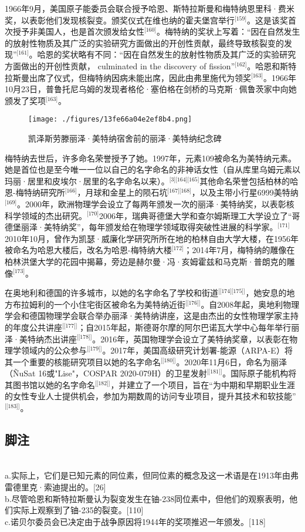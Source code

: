 1966年9月，美国原子能委员会联合授予哈恩、斯特拉斯曼和梅特纳恩里科·费米奖，以表彰他们发现核裂变。颁奖仪式在维也纳的霍夫堡宫举行\(^\text{[159]}\)。这是该奖首次授予非美国人，也是首次颁发给女性\(^\text{[160]}\)。梅特纳的奖状上写着：“因在自然发生的放射性物质及其广泛的实验研究方面做出的开创性贡献，最终导致核裂变的发现”\(^\text{[161]}\)。哈恩的奖状略有不同：“因在自然发生的放射性物质及其广泛的实验研究方面做出的开创性贡献， culminated in the discovery of fission”\(^\text{[162]}\)。哈恩和斯特拉斯曼出席了仪式，但梅特纳因病未能出席，因此由弗里施代为领奖\(^\text{[163]}\)。1966年10月23日，普鲁托尼乌姆的发现者格伦·塞伯格在剑桥的马克斯·佩鲁茨家中向她颁发了奖项\(^\text{[163]}\)。
\begin{figure}[ht]
\centering
\texttt{[image: ./figures/13fe66a04e2ef8b4.png]}
\caption{凯泽斯劳滕丽泽·美特纳宿舍前的丽泽·美特纳纪念碑} \label{fig_LZm_17}
\end{figure}
梅特纳去世后，许多命名荣誉授予了她。1997年，元素109被命名为美特纳元素。她是首位也是至今唯一一位以自己的名字命名的非神话女性（自从库里乌姆元素以玛丽·居里和皮埃尔·居里的名字命名以来）。\(^\text{[3][164][165]}\)其他命名荣誉包括柏林的哈恩-梅特纳研究所\(^\text{[166]}\)，月球和金星上的陨石坑\(^\text{[167][168]}\)，以及主带小行星6999美特纳\(^\text{[169]}\)。2000年，欧洲物理学会设立了每两年颁发一次的丽泽·美特纳奖，以表彰核科学领域的杰出研究。\(^\text{[170]}\)2006年，瑞典哥德堡大学和查尔姆斯理工大学设立了“哥德堡丽泽·美特纳奖”，每年颁发给在物理学领域取得突破性进展的科学家。\(^\text{[171]}\)2010年10月，曾作为凯瑟·威廉化学研究所所在地的柏林自由大学大楼，在1956年被命名为哈恩大楼后，改名为哈恩-梅特纳大楼\(^\text{[172]}\)；2014年7月，梅特纳的雕像在柏林洪堡大学的花园中揭幕，旁边是赫尔曼·冯·亥姆霍兹和马克斯·普朗克的雕像\(^\text{[173]}\)。

在奥地利和德国的许多城市，以她的名字命名了学校和街道\(^\text{[[174][175]]}\)，她安息的地方布拉姆利的一个小住宅街区被命名为美特纳近街\(^\text{[[176]]}\)。自2008年起，奥地利物理学会和德国物理学会联合举办丽泽·美特纳讲座，这是由杰出的女性物理学家主持的年度公共讲座\(^\text{[[177]]}\)；自2015年起，斯德哥尔摩的阿尔巴诺瓦大学中心每年举行丽泽·美特纳杰出讲座\(^\text{[[178]]}\)。2016年，英国物理学会设立了美特纳奖章，以表彰在物理学领域内的公众参与\(^\text{[[179]]}\)。2017年，美国高级研究计划署-能源（ARPA-E）将其一个重要的核能研究项目以她的名字命名\(^\text{[[180]]}\)。2020年11月6日，命名为丽泽（ÑuSat 16或"Lise"，COSPAR 2020-079H）的卫星发射\(^\text{[[181]]}\)。国际原子能机构将其图书馆以她的名字命名\(^\text{[[182]]}\)，并建立了一个项目，旨在“为中期和早期职业生涯的女性专业人士提供机会，参加为期数周的访问专业项目，提升其技术和软技能”\(^\text{[[183]]}\)。
\subsection{脚注}\\
a.实际上，它们是已知元素的同位素，但同位素的概念及这一术语是在1913年由弗雷德里克·索迪提出的。[26]\\
b.尽管哈恩和斯特拉斯曼认为裂变发生在铀-238同位素中，但他们的观察表明，他们实际上观察到了铀-235的裂变。[110]\\
c.诺贝尔委员会已决定由于战争原因将1944年的奖项推迟一年颁发。[118]\\
